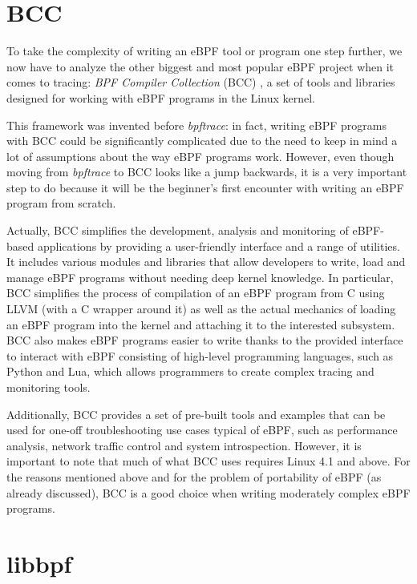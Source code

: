 \section{BCC}


To take the complexity of writing an eBPF tool or program one step further, we now have to analyze the other biggest and most popular eBPF project when it comes to tracing: \textit{BPF Compiler Collection} (BCC) \cite{BCCRepo}, a set of tools and libraries designed for working with eBPF programs in the Linux kernel.

This framework was invented before \textit{bpftrace}: in fact, writing eBPF programs with BCC could be significantly complicated due to the need to keep in mind a lot of assumptions about the way eBPF programs work.
However, even though moving from \textit{bpftrace} to BCC looks like a jump backwards, it is a very important step to do because it will be the beginner's first encounter with writing an eBPF program from scratch.
 
Actually, BCC simplifies the development, analysis and monitoring of eBPF-based applications by providing a user-friendly interface and a range of utilities. 
It includes various modules and libraries that allow developers to write, load and manage eBPF programs without needing deep kernel knowledge. 
In particular, BCC simplifies the process of compilation of an eBPF program from C using LLVM (with a C wrapper around it) as well as the actual mechanics of loading an eBPF program into the kernel and attaching it to the interested subsystem.
BCC also makes eBPF programs easier to write thanks to the provided interface to interact with eBPF consisting of high-level programming languages, such as Python and Lua, which allows programmers to create complex tracing and monitoring tools.

Additionally, BCC provides a set of pre-built tools and examples that can be used for one-off troubleshooting use cases typical of eBPF, such as performance analysis, network traffic control and system introspection.
However, it is important to note that much of what BCC uses requires Linux 4.1 and above.
For the reasons mentioned above and for the problem of portability of eBPF (as already discussed), BCC is a good choice when writing moderately complex eBPF programs.

\section{libbpf}

